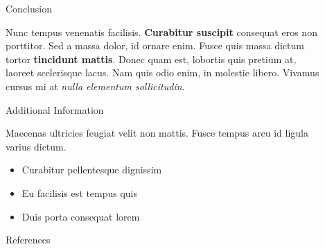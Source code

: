 \documentclass{article}
\begin{document}
\begin{frame}
\begin{columns}[t]
\begin{column}{\twocolwid}
\begin{columns}[t,totalwidth=\twocolwid]
\end{columns} %

\end{column} %

\begin{column}{\sepwid}\end{column} %

\begin{column}{\onecolwid} %


\begin{exampleblock}{Conclusion}

Nunc tempus venenatis facilisis. \textbf{Curabitur suscipit} consequat eros non porttitor. Sed a massa dolor, id ornare enim. Fusce quis massa dictum tortor \textbf{tincidunt mattis}. Donec quam est, lobortis quis pretium at, laoreet scelerisque lacus. Nam quis odio enim, in molestie libero. Vivamus cursus mi at \textit{nulla elementum sollicitudin}.

\end{exampleblock}


\begin{exampleblock}{Additional Information}

Maecenas ultricies feugiat velit non mattis. Fusce tempus arcu id ligula varius dictum. 
\begin{itemize}
\item Curabitur pellentesque dignissim
\item Eu facilisis est tempus quis
\item Duis porta consequat lorem
\end{itemize}

\end{exampleblock}


\begin{exampleblock}{References}


\end{exampleblock}
\end{column}
\end{columns}
\end{frame}
\end{document}
